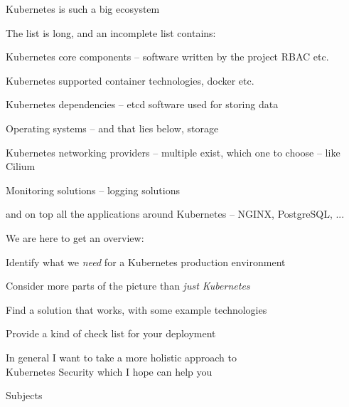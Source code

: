 \documentclass[Screen16to9,17pt]{foils}
\begin{document}
\begin{list1}
\item Kubernetes is such a big ecosystem
\item The list is long, and an incomplete list contains:
\begin{list2}
\item Kubernetes core components -- software written by the project RBAC etc.
\item Kubernetes supported container technologies, docker etc.
\item Kubernetes dependencies -- etcd software used for storing data
\item Operating systems -- and that lies below, storage
\item Kubernetes networking providers -- multiple exist, which one to choose -- like Cilium
\item Monitoring solutions -- logging solutions
\end{list2}
\item and on top all the applications around Kubernetes -- NGINX, PostgreSQL, ...
\end{list1}


We are here to get an overview:
\begin{list2}
\item Identify what we \emph{need} for a Kubernetes production environment
\item Consider more parts of the picture than \emph{just Kubernetes}
\item Find a solution that works, with some example technologies
\item Provide a kind of check list for your deployment
\end{list2}

In general I want to take a more holistic approach to \\
Kubernetes Security which I hope can help you





\begin{list1}
\item Subjects
\begin{list2}
\item
\item
\item
\item
\end{list2}
\end{list1}
\end{document}
